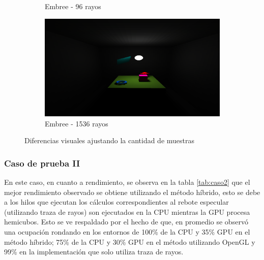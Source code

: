 \begin{figure}[H]
\begin{subfigure}{0.45\textwidth}
		\caption{Embree - 96 rayos}
	\end{subfigure}
	\begin{subfigure}{0.45\textwidth}
		\includegraphics[width=1\linewidth]{assets/512srt}
		\caption{Embree - 1536 rayos}
	\end{subfigure}
	\caption{Diferencias visuales ajustando la cantidad de muestras}
	\label{img:difres}
\end{figure}

\subsubsection{Caso de prueba II}

En este caso, en cuanto a rendimiento, se observa en la tabla \ref{tab:caso2} que el mejor rendimiento observado se obtiene utilizando el método híbrido, esto se debe a los hilos que ejecutan los cálculos correspondientes al rebote especular (utilizando traza de rayos) son ejecutados en la CPU mientras la GPU procesa hemicubos. Esto se ve respaldado por el hecho de que, en promedio se observó una ocupación rondando en los entornos de 100\% de la CPU y 35\% GPU en el método híbrido; 75\% de la CPU y 30\% GPU en el método utilizando OpenGL y 99\% en la implementación que solo utiliza traza de rayos. 


